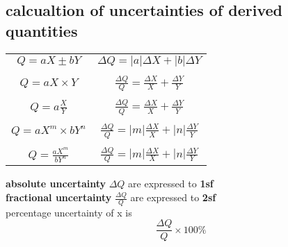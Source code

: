 \documentclass[a4paper, 10pt]{article}
\begin{document}
\subsection{calcualtion of uncertainties of derived quantities}
\begin{center}
   \begin{tabular}{c|c}
      $Q = aX \pm bY$ & $\Delta Q = |a|\Delta X + |b| \Delta Y$ \\ \\
      $Q = aX \times Y$ & $\frac{\Delta Q}{Q} = \frac{\Delta X}{X} + \frac{\Delta Y}{Y} $  \\ \\
      $Q = a\frac{X}{Y}$ & $\frac{\Delta Q}{Q} = \frac{\Delta X}{X} + \frac{\Delta Y}{Y} $  \\ \\
      $Q = aX^m \times bY^n$ & $\frac{\Delta Q}{Q} = |m|\frac{\Delta X}{X} + |n|\frac{\Delta Y}{Y} $  \\ \\
      $Q = \frac{aX^m}{bY^n}$ & $\frac{\Delta Q}{Q} = |m|\frac{\Delta X}{X} + |n|\frac{\Delta Y}{Y} $
   \end{tabular}
\end{center}

\textbf{absolute uncertainty} $\Delta Q$ are expressed to \textbf{1sf} \\

\textbf{fractional uncertainty} $\frac{\Delta Q}{Q}$ are expressed to \textbf{2sf} \\

percentage uncertainty of x is 
\[
   \frac{\Delta Q}{Q} \times 100\%
\]
\end{document}
